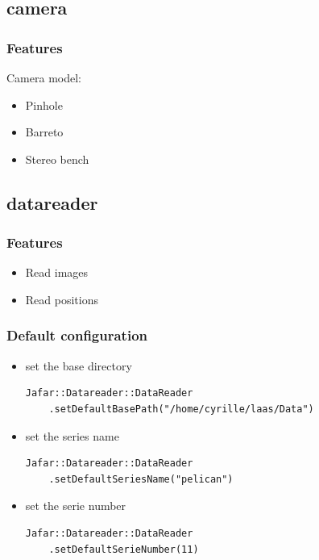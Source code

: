 \documentclass[pdf]{beamer}
\begin{document}

\subsection{camera}
\begin{frame}
  \frametitle{Features}
  Camera model:
  \begin{itemize}
   \item Pinhole
   \item Barreto
   \item Stereo bench
  \end{itemize}

\end{frame}


\subsection{datareader}
\begin{frame}
  \frametitle{Features}
  \begin{itemize}
    \item<1-> Read images
    \item<2-> Read positions
  \end{itemize}
\end{frame}
\begin{frame}[fragile]
  \frametitle{Default configuration}
    \begin{itemize}
      \item<1-> set the base directory
        \begin{lstlisting}
Jafar::Datareader::DataReader
    .setDefaultBasePath("/home/cyrille/laas/Data")
        \end{lstlisting}
      \item<2-> set the series name
        \begin{lstlisting}
Jafar::Datareader::DataReader
    .setDefaultSeriesName("pelican")
        \end{lstlisting}
      \item<3-> set the serie number
        \begin{lstlisting}
Jafar::Datareader::DataReader
    .setDefaultSerieNumber(11)
        \end{lstlisting}
    \end{itemize}
\end{frame}
\end{document}
